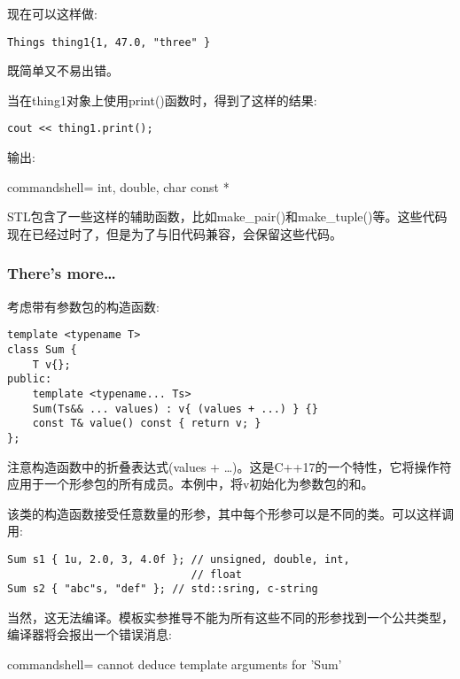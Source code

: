 现在可以这样做:

\begin{lstlisting}[style=styleCXX]
Things thing1{1, 47.0, "three" }
\end{lstlisting}

既简单又不易出错。

当在thing1对象上使用print()函数时，得到了这样的结果:

\begin{lstlisting}[style=styleCXX]
cout << thing1.print();
\end{lstlisting}

输出:

\begin{tcblisting}{commandshell={}}
int, double, char const *
\end{tcblisting}

STL包含了一些这样的辅助函数，比如make\_pair()和make\_tuple()等。这些代码现在已经过时了，但是为了与旧代码兼容，会保留这些代码。

\subsubsection{There's more…}

考虑带有参数包的构造函数:

\begin{lstlisting}[style=styleCXX]
template <typename T>
class Sum {
	T v{};
public:
	template <typename... Ts>
	Sum(Ts&& ... values) : v{ (values + ...) } {}
	const T& value() const { return v; }
};
\end{lstlisting}

注意构造函数中的折叠表达式(values + …)。这是C++17的一个特性，它将操作符应用于一个形参包的所有成员。本例中，将v初始化为参数包的和。

该类的构造函数接受任意数量的形参，其中每个形参可以是不同的类。可以这样调用:

\begin{lstlisting}[style=styleCXX]
Sum s1 { 1u, 2.0, 3, 4.0f }; // unsigned, double, int,
							 // float
Sum s2 { "abc"s, "def" }; // std::sring, c-string
\end{lstlisting}

当然，这无法编译。模板实参推导不能为所有这些不同的形参找到一个公共类型，编译器将会报出一个错误消息:

\begin{tcblisting}{commandshell={}}
cannot deduce template arguments for 'Sum'
\end{tcblisting}

